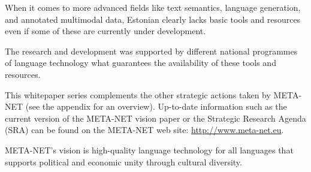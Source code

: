 \documentclass[]{../metanetpaper}
\begin{document}
\begin{multicols}{2}
When it comes to more advanced fields like text semantics, language generation, and annotated multimodal data, Estonian clearly lacks basic tools and resources even if some of these are currently under development. 

The research and development was supported by different national programmes of language technology what guarantees the availability of these tools and resources.


This whitepaper series complements the other strategic actions taken
by META-NET (see the appendix for an overview). Up-to-date information
such as the current version of the META-NET vision paper \cite{Meta1}
or the Strategic Research Agenda (SRA) can be found on the META-NET
web site: \url{http://www.meta-net.eu}. 

META-NET’s vision is high-quality language technology for all languages that supports political and economic unity through cultural diversity. 

\end{multicols}

\clearpage

\end{document}
